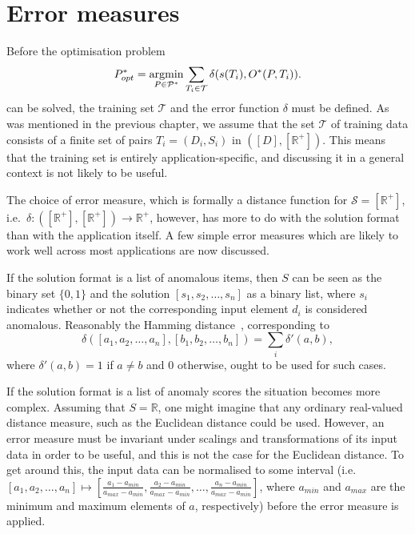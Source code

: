 \section{Error measures}
\label{sect:error_measures}

Before the optimisation problem
\[
    P^*_{opt} = \argmin_{P \in \mathcal{P}^*} \sum_{T_i \in \mathcal{T}} \delta(s(T_i), O^*(P, T_i)).
\]
can be solved, the training set $\mathcal{T}$ and the error function $\delta$ must be defined. As was mentioned in the previous chapter, we assume that the set $\mathcal{T}$ of training data consists of a finite set of pairs $T_i = (D_i, S_i)$ in $([D], [\mathbb{R}^+])$. This means that the training set is entirely application-specific, and discussing it in a general context is not likely to be useful.

The choice of error measure, which is formally a distance function for $\mathcal{S} = [\mathbb{R}^+]$, i.e.\ $\delta: ([\mathbb{R}^+], [\mathbb{R}^+]) \rightarrow \mathbb{R}^+$, however, has more to do with the solution format than with the application itself. A few simple error measures which are likely to work well across most applications are now discussed.

If the solution format is a list of anomalous items, then $S$ can be seen as the binary set $\{0, 1\}$ and the solution $[s_1, s_2, \dots, s_n]$ as a binary list, where $s_i$ indicates whether or not the corresponding input element $d_i$ is considered anomalous. Reasonably the Hamming distance~\cite{TODO}, corresponding to
\[
    \delta([a_1, a_2, \dots, a_n], [b_1, b_2, \dots, b_n]) = \sum_i \delta'(a, b),
\]
where $\delta'(a, b) = 1$ if $a \neq b$ and $0$ otherwise, ought to be used for such cases.

If the solution format is a list of anomaly scores the situation becomes more complex. Assuming that $S = \mathbb{R}$, one might imagine that any ordinary real-valued distance measure, such as the Euclidean distance could be used. However, an error measure must be invariant under scalings and transformations of its input data in order to be useful, and this is not the case for the Euclidean distance. To get around this, the input data can be normalised to some interval (i.e.\ $[a_1, a_2, \dots, a_n] \mapsto [\frac{a_1 - a_{min}}{a_{max} - a_{min}}, \frac{a_2 - a_{min}}{a_{max} - a_{min}}, \dots, \frac{a_n - a_{min}}{a_{max} - a_{min}}]$, where $a_{min}$ and $a_{max}$ are the minimum and maximum elements of $a$, respectively) before the error measure is applied.


